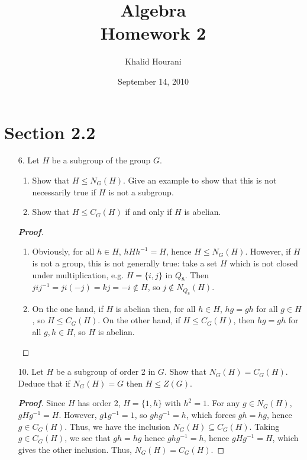\documentclass[12pt,leqno]{book}
\title{Algebra\\\large Homework 2}
\date{September 14, 2010}
\author{Khalid Hourani}
\theoremstyle{definition}
\newenvironment{Proof}{\begin{proof}[\textnormal{\textbf{Proof}}]}{\end{proof}}
\begin{document}
 \begin{titlepage}
  \maketitle
 \end{titlepage}
\section*{Section 2.2}
\begin{enumerate}
 \item [6.] Let $H$ be a subgroup of the group $G$.
  \begin{enumerate}
   \item Show that $H\leq N_G(H)$. Give an example to show that this is not necessarily true if $H$ is not a subgroup.
   \item Show that $H\leq C_G(H)$ if and only if $H$ is abelian.
  \end{enumerate}
\begin{Proof}
 \begin{enumerate}
  \item Obviously, for all $h\in H$, $hHh^{-1}=H$, hence $H\leq N_G(H)$. However, if $H$ is not a group, this is not generally true: take a set $H$ which is not closed under multiplication, e.g. $H=\{i,j\}$ in $Q_8$. Then $jij^{-1}=ji(-j)=kj=-i\notin H$, so $j\notin N_{Q_8}(H)$.
  \item On the one hand, if $H$ is abelian then, for all $h\in H$, $hg=gh$ for all $g\in H$, so $H\leq C_G(H)$. On the other hand, if $H\leq C_G(H)$, then $hg=gh$ for all $g,h\in H$, so $H$ is abelian. 
 \end{enumerate}
\end{Proof}
 \item [10.] Let $H$ be a subgroup of order 2 in $G$. Show that $N_G(H)=C_G(H)$. Deduce that if $N_G(H)=G$ then $H\leq Z(G)$.
\begin{Proof}
 Since $H$ has order 2, $H=\{1,h\}$ with $h^2=1$. For any $g\in N_G(H)$, $gHg^{-1}=H$. However, $g1g^{-1}=1$, so $ghg^{-1}=h$, which forces $gh=hg$, hence $g\in C_G(H)$. Thus, we have the inclusion $N_G(H)\subseteq C_G(H)$. Taking $g\in C_G(H)$, we see that $gh=hg$ hence $ghg^{-1}=h$, hence $gHg^{-1}=H$, which gives the other inclusion. Thus, $N_G(H)=C_G(H)$.


\end{Proof}
\end{enumerate}
\end{document}
